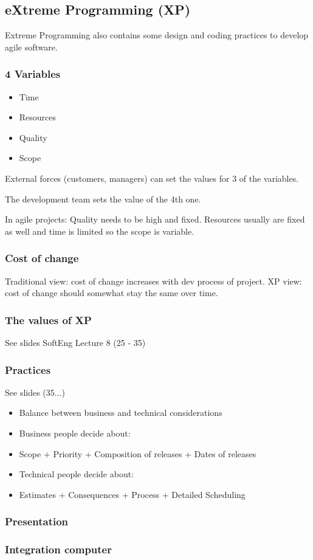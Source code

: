 \documentclass[12pt]{article}
\begin{document}
\subsection*{eXtreme Programming (XP)}
Extreme Programming also contains some design and coding practices to develop agile software.
\subsubsection*{4 Variables}
\begin{itemize}
    \item Time
    \item Resources
    \item Quality
    \item Scope
\end{itemize}
External forces (customers, managers) can set the values for 3 of the variables.

The development team sets the value of the 4th one.

In agile projects: Quality needs to be high and fixed. Resources usually are fixed as well and time is limited so the scope is variable.
\subsubsection*{Cost of change}
Traditional view: cost of change increases with dev process of project.
XP view: cost of change should somewhat stay the same over time.
\subsubsection*{The values of XP}
See slides SoftEng Lecture 8 (25 - 35)
\subsubsection*{Practices}
See slides (35...)
\begin{itemize}
    \item Balance between business and technical considerations
    \item Business people decide about:
    \item Scope + Priority + Composition of releases + Dates of releases
    \item Technical people decide about:
    \item Estimates + Consequences + Process + Detailed Scheduling
\end{itemize}

\subsubsection*{Presentation}
\subsubsection*{Integration computer}
\end{document}
